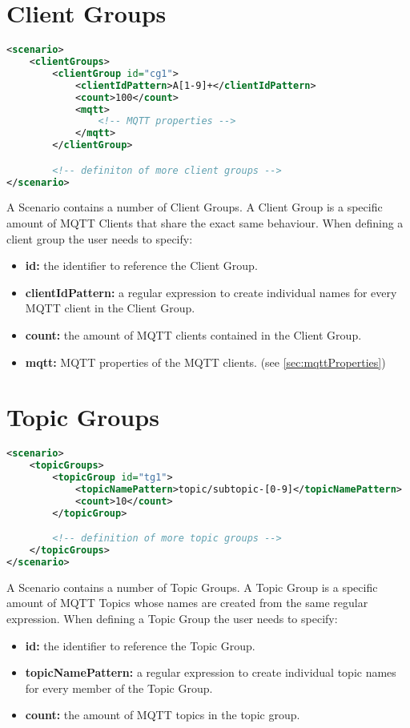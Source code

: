 \section{Client Groups}
\begin{lstlisting}[caption={XML defininition of Client Groups}, captionpos=b, label={lst:clientGroups}, language=XML]
<scenario>
	<clientGroups>
		<clientGroup id="cg1">
			<clientIdPattern>A[1-9]+</clientIdPattern>
			<count>100</count>
			<mqtt>
				<!-- MQTT properties -->
			</mqtt>
		</clientGroup>

		<!-- definiton of more client groups -->
</scenario>
\end{lstlisting}
A Scenario contains a number of Client Groups.
A Client Group is a specific amount of MQTT Clients that share the exact same behaviour.
When defining a client group the user needs to specify:
\begin{itemize}
	\item \textbf{id:} the identifier to reference the Client Group.
	\item \textbf{clientIdPattern:} a regular expression to create individual names for every MQTT client in the Client Group.
	\item \textbf{count:} the amount of MQTT clients contained in the Client Group.
	\item \textbf{mqtt:} MQTT properties of the MQTT clients. (see \ref{sec:mqttProperties})
\end{itemize}

\section{Topic Groups}
\begin{lstlisting}[caption={XMl definition of Topic Groups}, captionpos=b, label={lst:topicGroups}, language=XML]
<scenario>
	<topicGroups>
		<topicGroup id="tg1">
			<topicNamePattern>topic/subtopic-[0-9]</topicNamePattern>
			<count>10</count>
		</topicGroup>

		<!-- definition of more topic groups -->
	</topicGroups>
</scenario>
\end{lstlisting}
A Scenario contains a number of Topic Groups.
A Topic Group is a specific amount of MQTT Topics whose names are created from the same regular expression.
When defining a Topic Group the user needs to specify:
\begin{itemize}
	\item \textbf{id:} the identifier to reference the Topic Group.
	\item \textbf{topicNamePattern:} a regular expression to create individual topic names for every member of the Topic Group.
	\item \textbf{count:} the amount of MQTT topics in the topic group.
\end{itemize}

